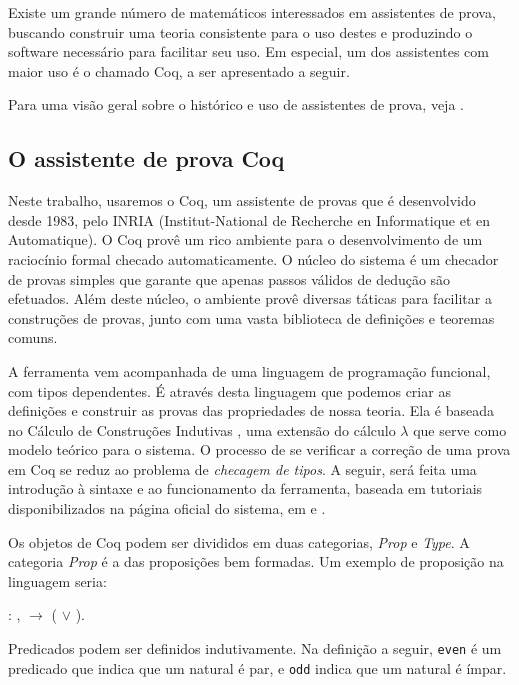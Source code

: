 Existe um grande número de matemáticos interessados em assistentes de prova,
buscando construir uma teoria consistente para o uso destes e produzindo o
software necessário para facilitar seu uso. Em especial, um dos assistentes com
maior uso é o chamado Coq, a ser apresentado a seguir.

Para uma visão geral sobre o histórico e uso de assistentes de prova, veja
\cite{proof_assist}. 

\subsection{O assistente de prova Coq}

Neste trabalho, usaremos o Coq, um assistente de provas que é desenvolvido desde
1983, pelo INRIA (Institut-National de Recherche en Informatique et en
Automatique). O Coq provê um rico ambiente para o desenvolvimento de um
raciocínio formal checado automaticamente. O núcleo do sistema é um checador de
provas simples que garante que apenas passos válidos de dedução são efetuados.
Além deste núcleo, o ambiente provê diversas táticas para facilitar a
construções de provas, junto com uma vasta biblioteca de definições e teoremas
comuns.

A ferramenta vem acompanhada de uma linguagem de programação funcional, com
tipos dependentes. É através desta linguagem que podemos criar as definições e
construir as provas das propriedades de nossa teoria. Ela é baseada no Cálculo
de Construções Indutivas \cite{coquand}, uma extensão do cálculo $\lambda$ que
serve como modelo teórico para o sistema. O processo de se verificar a correção
de uma prova em Coq se reduz ao problema de \emph{checagem de tipos}. A seguir,
será feita uma introdução à sintaxe e ao funcionamento da ferramenta, baseada em
tutoriais disponibilizados na página oficial do sistema, em \cite{coq} e
\cite{coq2}.


Os objetos de Coq podem ser divididos em duas categorias, \emph{Prop} e
\emph{Type}. A categoria \emph{Prop} é a das proposições bem formadas. Um
exemplo de proposição na linguagem seria:

\bigskip
\coqdockw{\ensuremath{\forall}}   : ,
 \ensuremath{\rightarrow} ( \ensuremath{\lor}
).\coqdoceol
\bigskip

Predicados podem ser definidos indutivamente. Na definição a seguir,
\texttt{even} é um predicado que indica que um natural é par, e \texttt{odd}
indica que um natural é ímpar.

